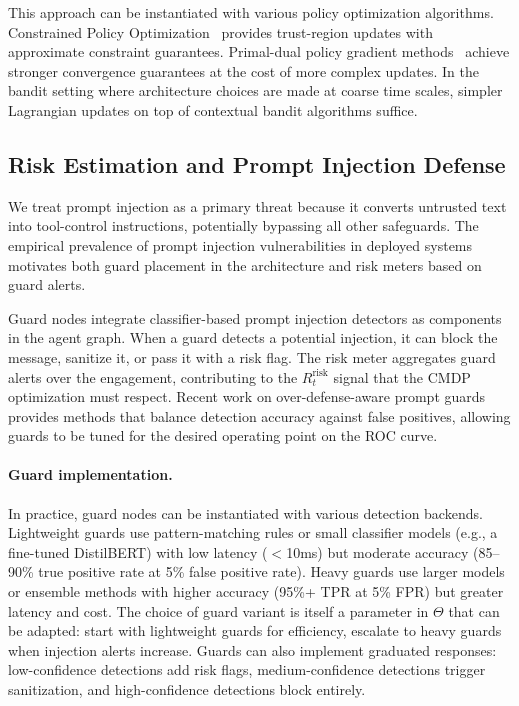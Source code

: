 \documentclass[sigconf,anonymous]{acmart}
\begin{document}
This approach can be instantiated with various policy optimization algorithms. Constrained Policy Optimization~\cite{achiam2017cpo} provides trust-region updates with approximate constraint guarantees. Primal-dual policy gradient methods~\cite{ding2024lastiterateconvergence} achieve stronger convergence guarantees at the cost of more complex updates. In the bandit setting where architecture choices are made at coarse time scales, simpler Lagrangian updates on top of contextual bandit algorithms suffice.

\subsection{Risk Estimation and Prompt Injection Defense}

We treat prompt injection as a primary threat because it converts untrusted text into tool-control instructions, potentially bypassing all other safeguards. The empirical prevalence of prompt injection vulnerabilities in deployed systems~\cite{liu2024promptinjection} motivates both guard placement in the architecture and risk meters based on guard alerts.

Guard nodes integrate classifier-based prompt injection detectors as components in the agent graph. When a guard detects a potential injection, it can block the message, sanitize it, or pass it with a risk flag. The risk meter aggregates guard alerts over the engagement, contributing to the $R_t^{\text{risk}}$ signal that the CMDP optimization must respect. Recent work on over-defense-aware prompt guards~\cite{li2024piguard,injecguard2024} provides methods that balance detection accuracy against false positives, allowing guards to be tuned for the desired operating point on the ROC curve.

\paragraph{Guard implementation.} In practice, guard nodes can be instantiated with various detection backends. Lightweight guards use pattern-matching rules or small classifier models (e.g., a fine-tuned DistilBERT) with low latency ($<$10ms) but moderate accuracy (85--90\% true positive rate at 5\% false positive rate). Heavy guards use larger models or ensemble methods with higher accuracy (95\%+ TPR at 5\% FPR) but greater latency and cost. The choice of guard variant is itself a parameter in $\Theta$ that can be adapted: start with lightweight guards for efficiency, escalate to heavy guards when injection alerts increase. Guards can also implement graduated responses: low-confidence detections add risk flags, medium-confidence detections trigger sanitization, and high-confidence detections block entirely.
\end{document}
